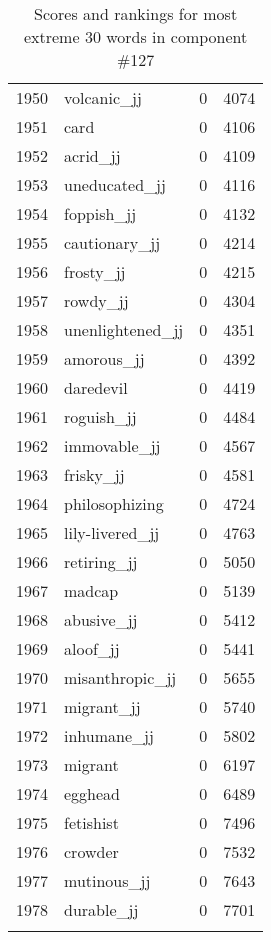 \begin{longtable}[!htbp]{| rlr@{.}l |}
    1950 & volcanic\_jj & 0 & 4074 \\
    1951 & card & 0 & 4106 \\
    1952 & acrid\_jj & 0 & 4109 \\
    1953 & uneducated\_jj & 0 & 4116 \\
    1954 & foppish\_jj & 0 & 4132 \\
    1955 & cautionary\_jj & 0 & 4214 \\
    1956 & frosty\_jj & 0 & 4215 \\
    1957 & rowdy\_jj & 0 & 4304 \\
    1958 & unenlightened\_jj & 0 & 4351 \\
    1959 & amorous\_jj & 0 & 4392 \\
    1960 & daredevil & 0 & 4419 \\
    1961 & roguish\_jj & 0 & 4484 \\
    1962 & immovable\_jj & 0 & 4567 \\
    1963 & frisky\_jj & 0 & 4581 \\
    1964 & philosophizing & 0 & 4724 \\
    1965 & lily-livered\_jj & 0 & 4763 \\
    1966 & retiring\_jj & 0 & 5050 \\
    1967 & madcap & 0 & 5139 \\
    1968 & abusive\_jj & 0 & 5412 \\
    1969 & aloof\_jj & 0 & 5441 \\
    1970 & misanthropic\_jj & 0 & 5655 \\
    1971 & migrant\_jj & 0 & 5740 \\
    1972 & inhumane\_jj & 0 & 5802 \\
    1973 & migrant & 0 & 6197 \\
    1974 & egghead & 0 & 6489 \\
    1975 & fetishist & 0 & 7496 \\
    1976 & crowder & 0 & 7532 \\
    1977 & mutinous\_jj & 0 & 7643 \\
    1978 & durable\_jj & 0 & 7701 \\
    \hline
    \caption{Scores and rankings for most extreme 30 words in component \#127} \\
\end{longtable}
